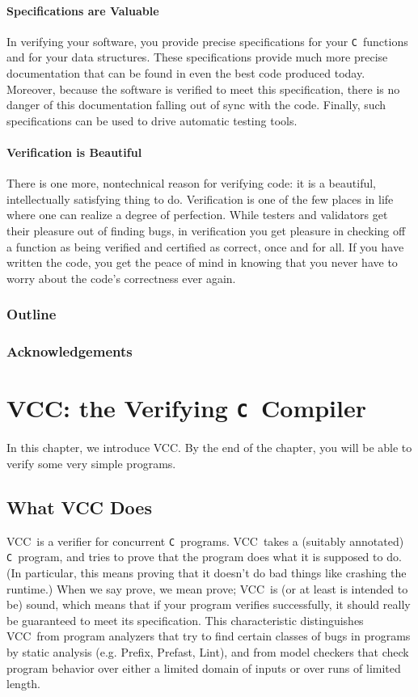 \documentclass{report}
\newcommand{\Q}[1]{\lstinline~#1~}
\newcommand{\C}{\Q{C}}
\newcommand{\VCC}{VCC}
\begin{document}
\subsubsection{Specifications are Valuable}
In verifying your software, you  provide precise specifications
for your \C\ functions and for your data structures. These
specifications provide much more precise documentation that can be
found in even the best code produced today. Moreover, because the
software is verified to meet this specification, there is no danger of
this documentation falling out of sync with the code. Finally, such
specifications can be used to drive automatic testing tools.

\subsubsection{Verification is Beautiful}

There is one more, nontechnical reason for verifying code: it is a
beautiful, intellectually satisfying thing to do.  Verification is one
of the few places in life where one can realize a degree of
perfection.  While testers and validators get their pleasure out of
finding bugs, in verification you get pleasure in checking off a
function as being verified and certified as correct, once and for all.
If you have written the code, you get the peace of mind in knowing
that you never have to worry about the code's correctness ever again.

\subsection{Outline}

\subsection{Acknowledgements}

\chapter{\VCC: the Verifying \C\ Compiler}
In this chapter, we introduce \VCC. By the end of the chapter, you
will be able to verify some very simple programs.

\section{What VCC Does}

\VCC\ is a verifier for concurrent \C\ programs. \VCC\ takes a
(suitably annotated) \C\ program, and tries to prove that the
program does what it is supposed to do. (In particular, this means
proving that it doesn't do bad things like crashing the runtime.) When
we say prove, we mean prove; \VCC\ is (or at least is intended to be)
sound, which means that if your program verifies successfully, it
should really be guaranteed to meet its specification. This
characteristic distinguishes \VCC\ from program analyzers that try to
find certain classes of bugs in programs by static analysis
(e.g. Prefix\cite{}, Prefast\cite{}, Lint\cite{}), and from model
checkers that check program behavior over either a limited domain of
inputs or over runs of limited length.
\end{document}
